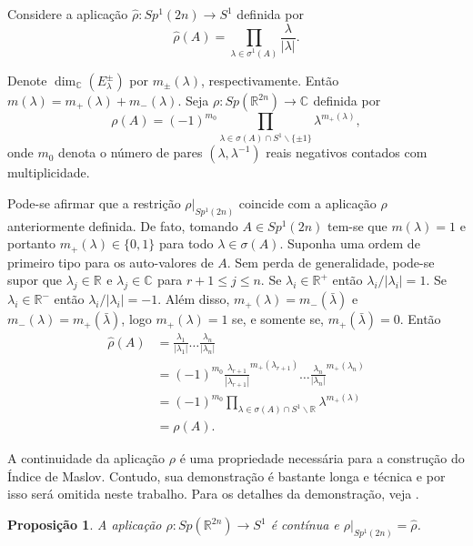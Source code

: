 \documentclass[12pt]{book}
\newtheorem{proposicao}[teorema]{Proposição}
\newcommand{\autoespaco}[1]{E_{#1}}
\newcommand{\autovalorprimeirotipo}[1]{\sigma^{1}(#1)}
\newcommand{\circulo}{S^{1}}
\newcommand{\complementar}[2]{#1 \backslash #2}
\newcommand{\complexo}[1]{\mathbb{C}^{#1}}
\newcommand{\espectrooperador}[1]{\sigma(#1)}
\newcommand{\gruposimpletico}[1]{Sp(#1)}
\newcommand{\gruposimpleticoespecial}[1]{Sp^{1}(#1)}
\newcommand{\real}[1]{\mathbb{R}^{#1}}
\newcommand{\reta}{\real{}}
\begin{document}
	Considere a aplicação $\hat{\rho}:\gruposimpleticoespecial{2n} \to \circulo$ definida por 
	$$
	\hat{\rho}(A) = \prod_{\lambda\in \autovalorprimeirotipo{A}}\frac{\lambda}{|\lambda|}.
	$$
	
	Denote $\dim_\complexo{}{}(\autoespaco{\lambda}^{\pm})$ por $m_{\pm}(\lambda)$, respectivamente. Então $m(\lambda)=m_{+}(\lambda)+m_{-}(\lambda)$. Seja $\rho: \gruposimpletico{\real{2n}}\to \complexo{}$ definida por
	$$
	\rho(A) = 	(-1)^{m_{0}} \prod_{\lambda \in \sigma(A)\cap \complementar{\circulo}{\{\pm 1 \}  }}\lambda^{m_{+}(\lambda)},
	$$
	onde $m_{0}$ denota o número de pares $(\lambda, \lambda^{-1})$ reais negativos contados com multiplicidade.
	
	Pode-se afirmar que a restrição $\rho|_{\gruposimpleticoespecial{2n}}$ coincide com a aplicação $\hat{\rho}$ anteriormente definida. De fato, tomando $A \in \gruposimpleticoespecial{2n}$ tem-se que $m(\lambda)=1$ e portanto $m_{+}(\lambda) \in \{0,1\}$ para todo $\lambda\in \espectrooperador{A}$. Suponha uma ordem de primeiro tipo para os auto-valores de $A$. Sem perda de generalidade, pode-se supor que $\lambda_{j} \in \reta$ e $\lambda_{j}\in \complexo{}$ para $r+1 \leq  j\leq n$. Se $\lambda_i\in \real{+}$ então $\lambda_i/|\lambda_i|=1$. Se $\lambda_i\in \real{-}$ então $\lambda_i/|\lambda_i|=-1$. Além disso, $m_{+}(\lambda)=m_{-}(\bar{\lambda})$ e $m_{-}(\lambda)=m_{+}(\bar{\lambda})$, logo $m_{+}(\lambda)=1$ se, e somente se, $m_{+}(\bar{\lambda})=0$. Então  
	$$
	\begin{aligned}
	\hat{\rho}(A) 
	&=
	\frac{\lambda_{1}}{|\lambda_{1}|}\dots \frac{\lambda_{n}}{|\lambda_{n}|}
	\\
	&= (-1)^{m_{0}}\frac{\lambda_{r+1}}{|\lambda_{r+1}|}^{m_{+}(\lambda_{r+1})} \dots \frac{\lambda_{n}}{|\lambda_{n}|}^{m_{+}(\lambda_{n})}
	\\
	&=(-1)^{m_{0}}\prod_{\lambda\in \espectrooperador{A}\cap\complementar{\circulo}{\reta}}\lambda^{m_{+}(\lambda)}
	\\
	&= \rho(A).
	\end{aligned}
	$$
	
	A continuidade da aplicação $\rho$ é uma propriedade necessária para a construção do Índice de Maslov. Contudo, sua demonstração é bastante longa e técnica e por isso será omitida neste trabalho. Para os detalhes da demonstração, veja \cite{audi_floer_homology}.
	
	
	\begin{proposicao}\label{proposicao_continuidade_rho}
		A aplicação $\rho: \gruposimpletico{\real{2n}}\to \circulo$ é contínua e $\rho|_{\gruposimpleticoespecial{2n}} = \hat{\rho}$.
	\end{proposicao}
	
\end{document}
